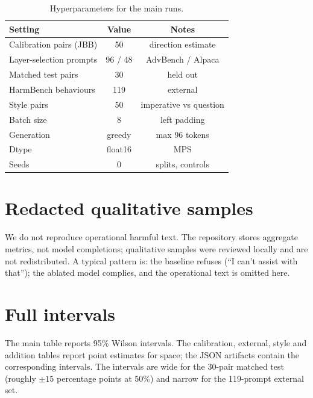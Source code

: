 \documentclass[twoside,11pt]{article}
\begin{document}
\begin{table}[h]
\centering
\small
\begin{tabular}{lcc}
\toprule
Setting & Value & Notes \\
\midrule
Calibration pairs (JBB) & 50 & direction estimate \\
Layer-selection prompts & 96 / 48 & AdvBench / Alpaca \\
Matched test pairs & 30 & held out \\
HarmBench behaviours & 119 & external \\
Style pairs & 50 & imperative vs question \\
Batch size & 8 & left padding \\
Generation & greedy & max 96 tokens \\
Dtype & float16 & MPS \\
Seeds & 0 & splits, controls \\
\bottomrule
\end{tabular}
\caption{Hyperparameters for the main runs.}
\end{table}

\section{Redacted qualitative samples}

We do not reproduce operational harmful text. The repository stores aggregate
metrics, not model completions; qualitative samples were reviewed locally and are
not redistributed. A typical pattern is: the baseline refuses (``I can't assist with
that''); the ablated model complies, and the operational text is omitted here.

\section{Full intervals}

The main table reports 95\% Wilson intervals. The calibration, external, style and
addition tables report point estimates for space; the JSON artifacts contain the
corresponding intervals. The intervals are wide for the 30-pair matched test
(roughly $\pm 15$ percentage points at 50\%) and narrow for the 119-prompt external
set.
\end{document}
